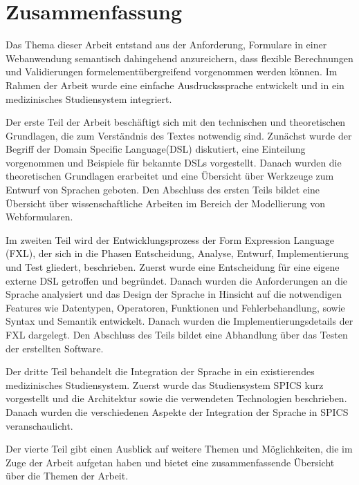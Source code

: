 


\chapter{Zusammenfassung}
\label{chapter_zusammenfassung}

Das Thema dieser Arbeit entstand aus der Anforderung, Formulare in einer Webanwendung semantisch dahingehend anzureichern, dass flexible Berechnungen und Validierungen formelementübergreifend vorgenommen werden können. Im Rahmen der Arbeit wurde eine einfache Ausdruckssprache entwickelt und in ein medizinisches Studiensystem integriert.

Der erste Teil der Arbeit beschäftigt sich mit den technischen und theoretischen Grundlagen, die zum Verständnis des Textes notwendig sind. Zunächst wurde der Begriff der Domain Specific Language(DSL) diskutiert, eine Einteilung vorgenommen und Beispiele für bekannte DSLs vorgestellt. Danach wurden die theoretischen Grundlagen erarbeitet und eine Übersicht über Werkzeuge zum Entwurf von Sprachen geboten. Den Abschluss des ersten Teils bildet eine Übersicht über wissenschaftliche Arbeiten im Bereich der Modellierung von Webformularen.

Im zweiten Teil wird der Entwicklungsprozess der Form Expression Language (FXL), der sich in die Phasen Entscheidung, Analyse, Entwurf, Implementierung und Test gliedert, beschrieben. Zuerst wurde eine Entscheidung für eine eigene externe DSL getroffen und begründet. Danach wurden die Anforderungen an die Sprache analysiert und das Design der Sprache in Hinsicht auf die notwendigen Features wie Datentypen, Operatoren, Funktionen und Fehlerbehandlung, sowie Syntax und Semantik entwickelt. Danach wurden die Implementierungsdetails der FXL dargelegt. Den Abschluss des Teils bildet eine Abhandlung über das Testen der erstellten Software.

Der dritte Teil behandelt die Integration der Sprache in ein existierendes medizinisches Studiensystem. Zuerst wurde das Studiensystem SPICS kurz vorgestellt und die Architektur sowie die verwendeten Technologien beschrieben. Danach wurden die verschiedenen Aspekte der Integration der Sprache in SPICS veranschaulicht.

Der vierte Teil gibt einen Ausblick auf weitere Themen und Möglichkeiten, die im Zuge der Arbeit aufgetan haben und bietet eine zusammenfassende Übersicht über die Themen der Arbeit.

